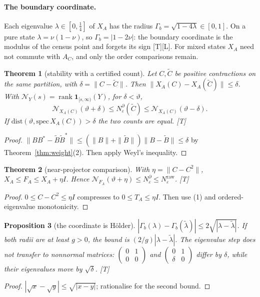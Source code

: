 \documentclass[11pt]{article}
\newtheorem{theorem}{Theorem}[section]
\newtheorem{proposition}[theorem]{Proposition}
\theoremstyle{definition}
\newcommand{\grade}[1]{\textsf{\small[#1]}}
\newcommand{\rank}{\operatorname{rank}}
\begin{document}
\paragraph{The boundary coordinate.} Each eigenvalue $\lambda\in[0,\tfrac14]$ of $X_A$ has the radius $\Gamma_b=\sqrt{1-4\lambda}\in[0,1]$. On a pure state $\lambda=\nu(1-\nu)$, so $\Gamma_b=|1-2\nu|$: the boundary coordinate is the modulus of the census point and forgets its sign \grade{T}\grade{L}. For mixed states $X_A$ need not commute with $A_C$, and only the order comparisons remain.

\begin{theorem}[stability with a certified count]\label{thm:stab}
Let $C,\tilde C$ be positive contractions on the same partition, with $\delta=\|C-\tilde C\|$. Then $\|X_A(C)-X_A(\tilde C)\|\le\delta$. With $\mathcal N_Y(s)=\rank\mathbf 1_{[s,\infty)}(Y)$, for $\delta<\vartheta$,
\[
\mathcal N_{X_A(C)}(\vartheta+\delta)\le N^\partial_\varepsilon(\tilde C)\le\mathcal N_{X_A(C)}(\vartheta-\delta).
\]
If $\mathrm{dist}(\vartheta,\mathrm{spec}\,X_A(C))>\delta$ the two counts are equal. \grade{T}
\end{theorem}
\begin{proof}
$\|BB^*-\tilde B\tilde B^*\|\le(\|B\|+\|\tilde B\|)\|B-\tilde B\|\le\delta$ by Theorem~\ref{thm:weight}(2). Then apply Weyl's inequality.
\end{proof}

\begin{theorem}[near-projector comparison]\label{thm:nearproj}
With $\eta=\|C-C^2\|$, $X_A\le F_A\le X_A+\eta I$. Hence $\mathcal N_{F_A}(\vartheta+\eta)\le N^\partial_\varepsilon\le N^{\mathrm{raw}}_\varepsilon$. \grade{T}
\end{theorem}
\begin{proof}
$0\le C-C^2\le\eta I$ compresses to $0\le T_A\le\eta I$. Then use (1) and ordered-eigenvalue monotonicity.
\end{proof}

\begin{proposition}[the coordinate is Hölder]\label{prop:holder}
$|\Gamma_b(\lambda)-\Gamma_b(\tilde\lambda)|\le2\sqrt{|\lambda-\tilde\lambda|}$. If both radii are at least $g>0$, the bound is $(2/g)|\lambda-\tilde\lambda|$. The eigenvalue step does not transfer to nonnormal matrices: $\begin{pmatrix}0&1\\0&0\end{pmatrix}$ and $\begin{pmatrix}0&1\\\delta&0\end{pmatrix}$ differ by $\delta$, while their eigenvalues move by $\sqrt\delta$. \grade{T}
\end{proposition}
\begin{proof}
$|\sqrt x-\sqrt y|\le\sqrt{|x-y|}$; rationalise for the second bound.
\end{proof}
\end{document}
